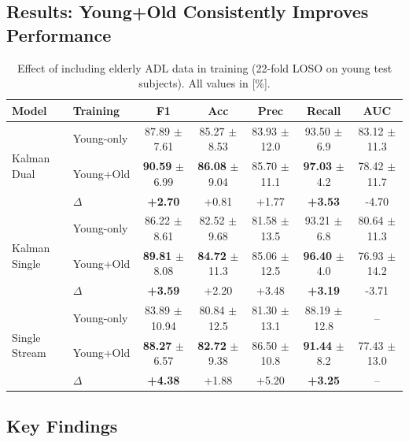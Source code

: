 \documentclass{article}
\begin{document}
\subsection{Results: Young+Old Consistently Improves Performance}

\begin{table}[htbp]
    \centering
    \caption{Effect of including elderly ADL data in training (22-fold LOSO on young test subjects). All values in [\%].}
    \label{tab:age_diverse_training}
    \begin{tabular}{llccccc}
        \toprule
        \textbf{Model} & \textbf{Training} & \textbf{F1} & \textbf{Acc} & \textbf{Prec} & \textbf{Recall} & \textbf{AUC} \\
        \midrule
        \multirow{3}{*}{Kalman Dual}
        & Young-only & 87.89 $\pm$ 7.61 & 85.27 $\pm$ 8.53 & 83.93 $\pm$ 12.0 & 93.50 $\pm$ 6.9 & 83.12 $\pm$ 11.3 \\
        & Young+Old & \textbf{90.59} $\pm$ 6.99 & \textbf{86.08} $\pm$ 9.04 & 85.70 $\pm$ 11.1 & \textbf{97.03} $\pm$ 4.2 & 78.42 $\pm$ 11.7 \\
        & $\Delta$ & \textbf{+2.70} & +0.81 & +1.77 & \textbf{+3.53} & -4.70 \\
        \midrule
        \multirow{3}{*}{Kalman Single}
        & Young-only & 86.22 $\pm$ 8.61 & 82.52 $\pm$ 9.68 & 81.58 $\pm$ 13.5 & 93.21 $\pm$ 6.8 & 80.64 $\pm$ 11.3 \\
        & Young+Old & \textbf{89.81} $\pm$ 8.08 & \textbf{84.72} $\pm$ 11.3 & 85.06 $\pm$ 12.5 & \textbf{96.40} $\pm$ 4.0 & 76.93 $\pm$ 14.2 \\
        & $\Delta$ & \textbf{+3.59} & +2.20 & +3.48 & \textbf{+3.19} & -3.71 \\
        \midrule
        \multirow{3}{*}{Single Stream}
        & Young-only & 83.89 $\pm$ 10.94 & 80.84 $\pm$ 12.5 & 81.30 $\pm$ 13.1 & 88.19 $\pm$ 12.8 & -- \\
        & Young+Old & \textbf{88.27} $\pm$ 6.57 & \textbf{82.72} $\pm$ 9.38 & 86.50 $\pm$ 10.8 & \textbf{91.44} $\pm$ 8.2 & 77.43 $\pm$ 13.0 \\
        & $\Delta$ & \textbf{+4.38} & +1.88 & +5.20 & \textbf{+3.25} & -- \\
        \bottomrule
    \end{tabular}
\end{table}

\subsection{Key Findings}
\end{document}
